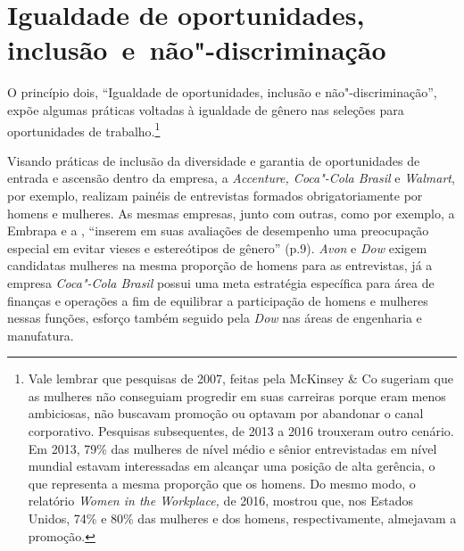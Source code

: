 \section{Igualdade de oportunidades, inclusão~e~não"-discriminação}

O princípio dois, ``Igualdade de oportunidades, inclusão e
não"-discriminação'', expõe algumas práticas voltadas à igualdade de
gênero nas seleções para oportunidades de trabalho.\footnote{Vale
  lembrar que pesquisas de 2007, feitas pela McKinsey \& Co sugeriam que
  as mulheres não conseguiam progredir em suas carreiras porque eram
  menos ambiciosas, não buscavam promoção ou optavam por abandonar o
  canal corporativo. Pesquisas subsequentes, de 2013 a 2016 trouxeram
  outro cenário. Em 2013, 79\% das mulheres de nível médio e sênior
  entrevistadas em nível mundial estavam interessadas em alcançar uma
  posição de alta gerência, o que representa a mesma proporção que os
  homens. Do mesmo modo, o relatório \emph{Women in the Workplace,} de
  2016, mostrou que, nos Estados Unidos, 74\% e 80\% das mulheres e dos
  homens, respectivamente, almejavam a promoção.}

Visando práticas de inclusão da diversidade e garantia de oportunidades
de entrada e ascensão dentro da empresa, a \emph{Accenture, Coca"-Cola
Brasil} e \emph{Walmart}, por exemplo, realizam painéis de entrevistas
formados obrigatoriamente por homens e mulheres. As mesmas empresas,
junto com outras, como por exemplo, a Embrapa e a , ``inserem em suas
avaliações de desempenho uma preocupação especial em evitar vieses e
estereótipos de gênero'' (p.9). \emph{Avon} e \emph{Dow} exigem
candidatas mulheres na mesma proporção de homens para as entrevistas, já
a empresa \emph{Coca"-Cola Brasil} possui uma meta estratégia específica
para área de finanças e operações a fim de equilibrar a participação de
homens e mulheres nessas funções, esforço também seguido pela \emph{Dow}
nas áreas de engenharia e manufatura.

